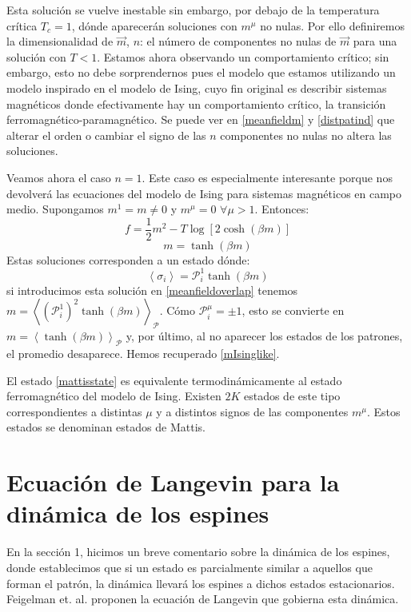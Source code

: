\documentclass[titlepage,12pt]{article}
\numberwithin{equation}{section}
\begin{document}
	Esta solución se vuelve inestable sin embargo, por debajo de la temperatura crítica $T_c=1$, dónde aparecerán soluciones con $m^\mu$ no nulas. Por ello definiremos la dimensionalidad de $\vec{m}$, $n$: el número de componentes no nulas de $\vec{m}$ para una solución con $T<1$. Estamos ahora observando un comportamiento crítico; sin embargo, esto no debe sorprendernos pues el modelo que estamos utilizando un modelo inspirado en el modelo de Ising, cuyo fin original es describir sistemas magnéticos donde efectivamente hay un comportamiento crítico, la transición ferromagnético-paramagnético. Se puede ver en \eqref{meanfieldm} y \eqref{distpatind} que alterar el orden o cambiar el signo de las $n$ componentes no nulas no altera las soluciones.
	
	Veamos ahora el caso $n=1$. Este caso es especialmente interesante porque nos devolverá las ecuaciones del modelo de Ising para sistemas magnéticos en campo medio. Supongamos $m^1=m\neq0$ y $m^\mu = 0\,\,\forall \mu>1$. Entonces:
	\begin{equation}
	f=\frac{1}{2}m^2 - T\log\left[2\cosh(\beta m)\right]
	\label{fIsinglike}
	\end{equation}
	\begin{equation}
	m=\tanh(\beta m)
	\label{mIsinglike}
	\end{equation}
	Estas soluciones corresponden a un estado dónde:
	\begin{equation}
	\left<\sigma_i\right>=\mathcal{P}_i^1\tanh(\beta m)
	\label{mattisstate}
	\end{equation}
	si introducimos esta solución en \eqref{meanfieldoverlap} tenemos $m=\left<(\mathcal{P}_i^1)^2\tanh(\beta m)\right>_{\mathcal{P}}$. Cómo $\mathcal{P}^\mu_i=\pm 1$, esto se convierte en $m=\left<\tanh(\beta m)\right>_{\mathcal{P}}$ y, por último, al no aparecer los estados de los patrones, el promedio desaparece. Hemos recuperado \eqref{mIsinglike}. 
	
	El estado \eqref{mattisstate} es equivalente termodinámicamente al estado ferromagnético del modelo de Ising. Existen $2K$ estados de este tipo correspondientes a distintas $\mu$ y a distintos signos de las componentes $m^\mu$. Estos estados se denominan estados de Mattis.
	\section{Ecuación de Langevin para la dinámica de los espines}
	En la sección 1, hicimos un breve comentario sobre la dinámica de los espines, donde establecimos que si un estado es parcialmente similar a aquellos que forman el patrón, la dinámica llevará los espines a dichos estados estacionarios. Feigelman et. al. \cite{feigelman86} proponen la ecuación de Langevin que gobierna esta dinámica. 
	
\end{document}
